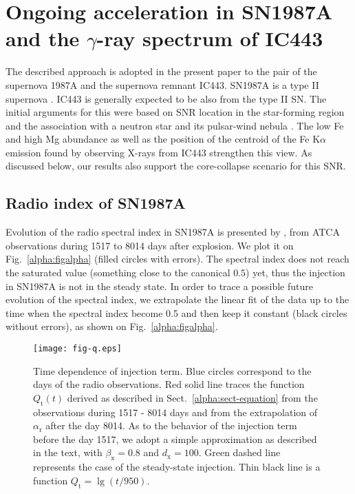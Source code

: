 \documentclass{aa}
\newcommand\rs[1]{_\mathrm{#1}}
\newcommand\g{$\gamma$}
\begin{document}
\section{Ongoing acceleration in SN1987A and the \g-ray spectrum of IC443}
\label{alpha:sect-sn1987a}

The described approach is adopted in the present paper to the pair of the supernova 1987A and the supernova remnant IC443.  
SN1987A is a type II supernova \citep{Lymanetal-2014}. IC443 is generally expected to be also from the type II SN. The initial arguments for this were based on SNR location in the star-forming region and the association with a neutron star and its pulsar-wind nebula \citep{Bocchino-Bykov-2001,Olbert-etal-2001,Gaensler-etal-2006,Swartz-etal-2015}. The low Fe and high Mg abundance \citep{Troja-etal-2008} as well as the position of the centroid of the Fe K$\alpha$ emission \citep{Yamaguchi-etal-2014} found by observing X-rays from IC443 strengthen this view. As discussed below, our results also support the core-collapse scenario for this SNR. 

\subsection{Radio index of SN1987A}
\label{alpha:sectradio}

Evolution of the radio spectral index in SN1987A is presented by \citet{Zanardo-etal-2010}, from ATCA observations during 1517 to 8014 days after explosion. We plot it on Fig.~\ref{alpha:figalpha} (filled circles with errors). The spectral index does not reach the saturated value (something close to the canonical $0.5$) yet, thus the injection in SN1987A is not in the steady state. In order to trace a possible future evolution of the spectral index, we extrapolate the linear fit of the data up to the time when the spectral index become 0.5 and then keep it constant (black circles without errors), as shown on Fig.~\ref{alpha:figalpha}. 


\begin{figure}
 \centering
 \texttt{[image: fig-q.eps]}
 \caption{Time dependence of injection term. Blue circles correspond to the days of the radio observations. Red solid line traces the function $Q\rs{t}(t)$ derived as described in Sect.~\ref{alpha:sect-equation} from the observations during 1517 - 8014 days and from the extrapolation of $\alpha\rs{r}$ after the day 8014. As to the behavior of the injection term before the day 1517, we adopt a simple approximation as described in the text, with $\beta\rs{x}=0.8$ and $d\rs{x}=100$.
 Green dashed line represents the case of the steady-state injection. Thin black line is a function $Q\rs{t}=\lg(t/950)$. 
               }
 \label{alpha:figq}
\end{figure}
\end{document}
